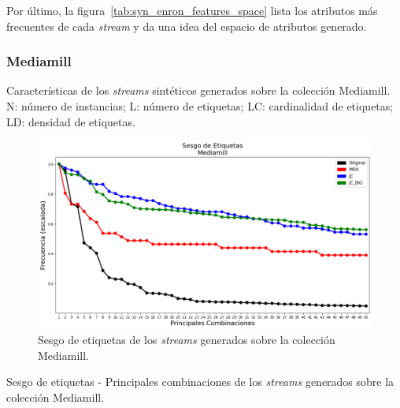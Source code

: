Por último, la figura~\ref{tab:syn_enron_features_space} lista los atributos más
frecuentes de cada \textit{stream} y da una idea del espacio de atributos
generado.

\subsubsection{Mediamill}

\begin{table}[htbp]
	\centering
	\begin{adjustbox}{max width=\textwidth}
		
	\end{adjustbox}
	\caption[Características de los \textit{streams} sintéticos generados sobre
		la colección Mediamill.]{Características de los \textit{streams} sintéticos generados sobre
		la colección Mediamill.  N: número de instancias; L: número de etiquetas; LC:
		cardinalidad de etiquetas; LD: densidad de etiquetas.}
	\label{tab:syn_mediamill_stats}
\end{table}

\begin{figure}[htbp]
	\includegraphics[width=\linewidth]{figures/experiments/syn/mediamill/label_skew.png}
	\caption{Sesgo de etiquetas de los \textit{streams} generados sobre la
		colección Mediamill.}
	\label{fig:syn_mediamill_label_skew}
\end{figure}

\begin{table}[htbp]
	\centering
	\begin{adjustbox}{max width=\textwidth}
		
	\end{adjustbox}
	\caption{Sesgo de etiquetas - Principales combinaciones de los
		\textit{streams} generados sobre la colección Mediamill.}
	\label{tab:syn_mediamill_top_labels_combinations}
\end{table}

